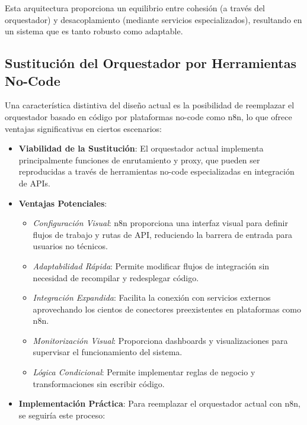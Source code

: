 \documentclass[12pt,a4paper]{article}
\begin{document}
Esta arquitectura proporciona un equilibrio entre cohesión (a través del orquestador) y desacoplamiento (mediante servicios especializados), resultando en un sistema que es tanto robusto como adaptable.

\subsection{Sustitución del Orquestador por Herramientas No-Code}
\label{subsec:os-nocode}

Una característica distintiva del diseño actual es la posibilidad de reemplazar el orquestador basado en código por plataformas no-code como n8n, lo que ofrece ventajas significativas en ciertos escenarios:

\begin{itemize}
    \item \textbf{Viabilidad de la Sustitución}: El orquestador actual implementa principalmente funciones de enrutamiento y proxy, que pueden ser reproducidas a través de herramientas no-code especializadas en integración de APIs.
    
    \item \textbf{Ventajas Potenciales}:
    \begin{itemize}
        \item \textit{Configuración Visual}: n8n proporciona una interfaz visual para definir flujos de trabajo y rutas de API, reduciendo la barrera de entrada para usuarios no técnicos.
        
        \item \textit{Adaptabilidad Rápida}: Permite modificar flujos de integración sin necesidad de recompilar y redesplegar código.
        
        \item \textit{Integración Expandida}: Facilita la conexión con servicios externos aprovechando los cientos de conectores preexistentes en plataformas como n8n.
        
        \item \textit{Monitorización Visual}: Proporciona dashboards y visualizaciones para supervisar el funcionamiento del sistema.
        
        \item \textit{Lógica Condicional}: Permite implementar reglas de negocio y transformaciones sin escribir código.
    \end{itemize}
    
    \item \textbf{Implementación Práctica}: Para reemplazar el orquestador actual con n8n, se seguiría este proceso:
    

\end{itemize}
\end{document}
